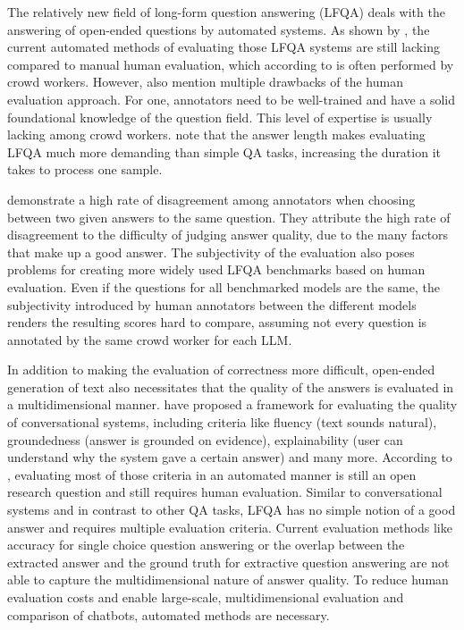 The relatively new field of long-form question answering (LFQA) deals with the answering of open-ended questions by automated systems.
As shown by \cite{xu:2023:A}, the current automated methods of evaluating those LFQA systems are still lacking compared to manual human evaluation, which according to \cite{xu:2023:A} is often performed by crowd workers.
However, \cite{xu:2023:A} also mention multiple drawbacks of the human evaluation approach.
For one, annotators need to be well-trained and have a solid foundational knowledge of the question field.
This level of expertise is usually lacking among crowd workers.
\cite{krishna:2021:Hurdles} note that the answer length makes evaluating LFQA much more demanding than simple QA tasks, increasing the duration it takes to process one sample.

\cite{krishna:2021:Hurdles} demonstrate a high rate of disagreement among annotators when choosing between two given answers to the same question.
They attribute the high rate of disagreement to the difficulty of judging answer quality, due to the many factors that make up a good answer.
The subjectivity of the evaluation also poses problems for creating more widely used LFQA benchmarks based on human evaluation.
Even if the questions for all benchmarked models are the same, the subjectivity introduced by human annotators between the different models renders the resulting scores hard to compare, assuming not every question is annotated by the same crowd worker for each LLM.

In addition to making the evaluation of correctness more difficult, open-ended generation of text also necessitates that the quality of the answers is evaluated in a multidimensional manner.
\cite{sakai:2023:swan} have proposed a framework for evaluating the quality of conversational systems, including criteria like fluency (text sounds natural), groundedness (answer is grounded on evidence), explainability (user can understand why the system gave a certain answer) and many more.
According to \cite{sakai:2023:swan}, evaluating most of those criteria in an automated manner is still an open research question and still requires human evaluation. 
Similar to conversational systems and in contrast to other QA tasks, LFQA has no simple notion of a good answer and requires multiple evaluation criteria.
Current evaluation methods like accuracy for single choice question answering or the overlap between the extracted answer and the ground truth for extractive question answering are not able to capture the multidimensional nature of answer quality.
To reduce human evaluation costs and enable large-scale, multidimensional evaluation and comparison of chatbots, automated methods are necessary.

